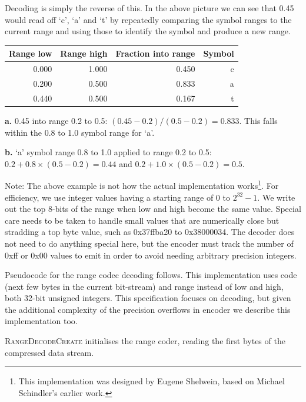 \documentclass[a4paper]{article}
\begin{document}
Decoding is simply the reverse of this.  In the above picture we can see that 0.45 would read off `c', `a' and `t' by repeatedly comparing the symbol ranges to the current range and using those to identify the symbol and produce a new range.

\begin{threeparttable}[t]
\begin{tabular}{rrrr}
\hline
\textbf{Range low} & \textbf{Range high} & \textbf{Fraction into range} & \textbf{Symbol}\\
\hline
0.000 & 1.000 & 0.450 & c\\
0.200 & 0.500 & 0.833\tnote{\textbf{a}} & a\\
0.440\tnote{\textbf{b}} & 0.500 & 0.167 & t\\
\hline
\end{tabular}
\begin{tablenotes}
\item{\textbf{a.}} 0.45 into range 0.2 to 0.5: $(0.45-0.2)/(0.5-0.2) = 0.833$.
This falls within the 0.8 to 1.0 symbol range for `a'.
\item{\textbf{b.}} `a' symbol range 0.8 to 1.0 applied to range 0.2 to 0.5:  $0.2+0.8\times(0.5-0.2) = 0.44$ and $0.2+1.0\times(0.5-0.2) = 0.5$.
\end{tablenotes}
\end{threeparttable}

Note: The above example is not how the actual implementation works\footnote{This implementation was designed by Eugene Shelwein, based on Michael Schindler's earlier work.}.
For efficiency, we use integer values having a starting range of 0 to $2^{32}-1$.
We write out the top 8-bits of the range when low and high become the same value.
Special care needs to be taken to handle small values that are numerically close but stradding a top byte value, such as 0x37ffba20 to 0x38000034.
The decoder does not need to do anything special here, but the encoder must track the number of 0xff or 0x00 values to emit in order to avoid needing arbitrary precision integers.

Pseudocode for the range codec decoding follows.
This implementation uses code (next few bytes in the current bit-stream) and range instead of low and high, both 32-bit unsigned integers.
This specification focuses on decoding, but given the additional complexity of the precision overflows in encoder we describe this implementation too.

\textsc{RangeDecodeCreate} initialises the range coder, reading the first bytes of the compressed data stream.
\end{document}
